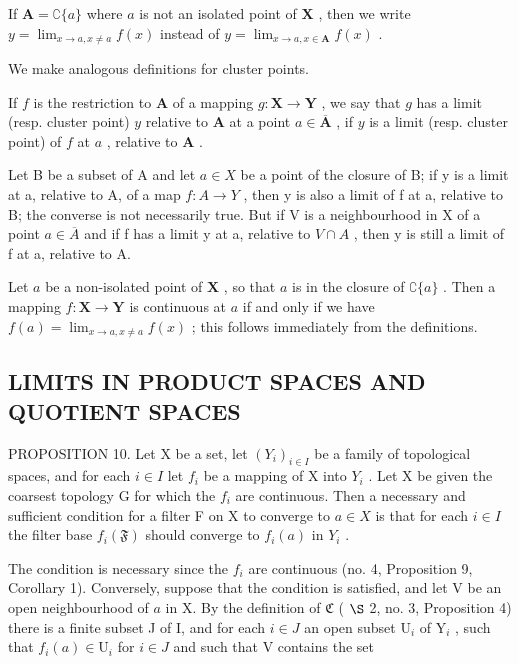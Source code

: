 If \(\mathbf{A} = \complement\{a\}\) where \(a\) is not an isolated point of \(\mathbf{X}\) , then we write \(y = \lim_{x\to a,x\neq a}f(x)\) instead of \(y = \lim_{x\to a,x\in \mathbf{A}}f(x)\) .

We make analogous definitions for cluster points.

If \(f\) is the restriction to \(\mathbf{A}\) of a mapping \(g: \mathbf{X} \to \mathbf{Y}\) , we say that \(g\) has a limit (resp. cluster point) \(y\) relative to \(\mathbf{A}\) at a point \(a \in \overline{\mathbf{A}}\) , if \(y\) is a limit (resp. cluster point) of \(f\) at \(a\) , relative to \(\mathbf{A}\) .

Let B be a subset of A and let \(a \in X\) be a point of the closure of B; if y is a limit at a, relative to A, of a map \(f: A \to Y\) , then y is also a limit of f at a, relative to B; the converse is not necessarily true. But if V is a neighbourhood in X of a point \(a \in \overline{A}\) and if f has a limit y at a, relative to \(V \cap A\) , then y is still a limit of f at a, relative to A.

Let \(a\) be a non-isolated point of \(\mathbf{X}\) , so that \(a\) is in the closure of \(\complement\{a\}\) . Then a mapping \(f: \mathbf{X} \to \mathbf{Y}\) is continuous at \(a\) if and only if we have \(f(a) = \lim_{x \to a, x \neq a} f(x)\) ; this follows immediately from the definitions.

\subsection{LIMITS IN PRODUCT SPACES AND QUOTIENT SPACES}

PROPOSITION 10. Let X be a set, let \((Y_{i})_{i\in I}\) be a family of topological spaces, and for each \(i\in I\) let \(f_{i}\) be a mapping of X into \(Y_{i}\) . Let X be given the coarsest topology G for which the \(f_{i}\) are continuous. Then a necessary and sufficient condition for a filter F on X to converge to \(a\in X\) is that for each \(i\in I\) the filter base \(f_{i}(\mathfrak{F})\) should converge to \(f_{i}(a)\) in \(Y_{i}\) .

The condition is necessary since the \(f_{i}\) are continuous (no. 4, Proposition 9, Corollary 1). Conversely, suppose that the condition is satisfied, and let V be an open neighbourhood of \(a\) in X. By the definition of \(\mathfrak{C}\) ( \(\S\) 2, no. 3, Proposition 4) there is a finite subset J of I, and for each \(i\in J\) an open subset \(\mathrm{U}_{i}\) of \(\mathrm{Y}_{i}\) , such that \(f_{i}(a)\in\mathrm{U}_{i}\) for \(i\in J\) and such that V contains the set

